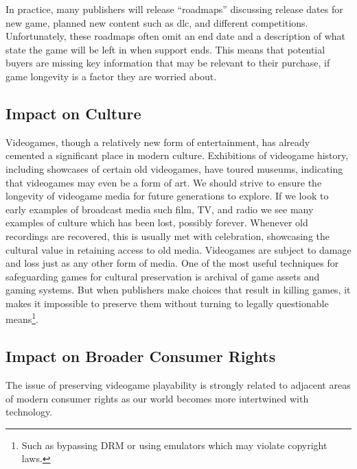 In practice, many publishers will release ``roadmaps'' discussing release dates for new game, planned new content such as \gls{dlc}, and different competitions.
Unfortunately, these roadmaps often omit an end date and a description of what state the game will be left in when support ends.
This means that potential buyers are missing key information that may be relevant to their purchase, if game longevity is a factor they are worried about.

\subsection{Impact on Culture}
Videogames, though a relatively new form of entertainment, has already cemented a significant place in modern culture.
Exhibitions of videogame history, including showcases of certain old videogames, have toured museums, indicating that videogames may even be a form of art.
We should strive to ensure the longevity of videogame media for future generations to explore.
If we look to early examples of broadcast media such film, TV, and radio we see many examples of culture which has been lost, possibly forever.
Whenever old recordings are recovered, this is usually met with celebration, showcasing the cultural value in retaining access to old media.
Videogames are subject to damage and loss just as any other form of media.
One of the most useful techniques for safeguarding games for cultural preservation is archival of game \glspl{asset} and gaming systems.
But when publishers make choices that result in killing games, it makes it impossible to preserve them without turning to legally questionable means\footnote{
    Such as bypassing DRM or using emulators which may violate copyright laws.
}.


\subsection{Impact on Broader Consumer Rights}
The issue of preserving videogame playability is strongly related to adjacent areas of modern consumer rights as our world becomes more intertwined with technology.

